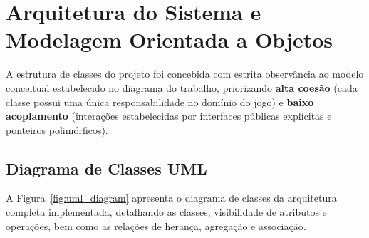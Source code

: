 \documentclass[12pt,a4paper]{article}
\begin{document}
\section{Arquitetura do Sistema e Modelagem Orientada a Objetos}
\label{sec:arquitetura}

A estrutura de classes do projeto foi concebida com estrita observância ao modelo conceitual estabelecido no diagrama do trabalho, priorizando \textbf{alta coesão} (cada classe possui uma única responsabilidade no domínio do jogo) e \textbf{baixo acoplamento} (interações estabelecidas por interfaces públicas explícitas e ponteiros polimórficos).

\subsection{Diagrama de Classes UML}
A Figura~\ref{fig:uml_diagram} apresenta o diagrama de classes da arquitetura completa implementada, detalhando as classes, visibilidade de atributos e operações, bem como as relações de herança, agregação e associação.
\end{document}
